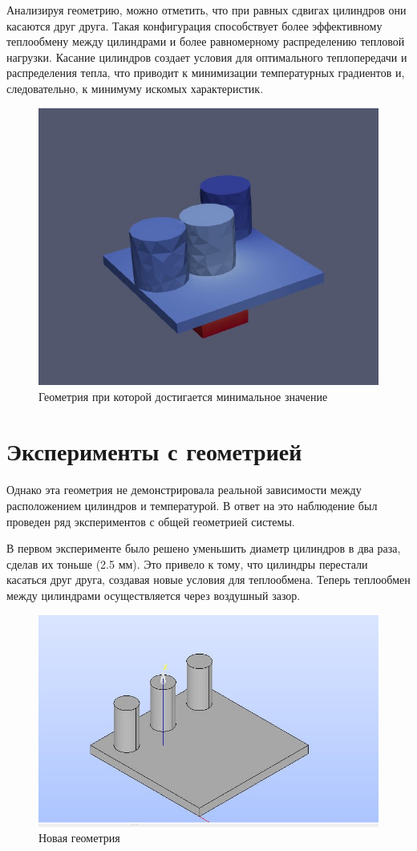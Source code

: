 \documentclass[a4paper,12pt]{article}
\theoremstyle{plain} %
\theoremstyle{definition} %
\theoremstyle{remark} %
\begin{document}
Анализируя геометрию, можно отметить, что при равных сдвигах цилиндров они касаются друг друга. Такая конфигурация способствует более эффективному теплообмену между цилиндрами и более равномерному распределению тепловой нагрузки. Касание цилиндров создает условия для оптимального теплопередачи и распределения тепла, что приводит к минимизации температурных градиентов и, следовательно, к минимуму искомых характеристик.

\begin{figure}[h]
	\begin{center}
		\includegraphics[width=0.4\linewidth]{19.jpg}
		\caption{Геометрия при которой достигается минимальное значение} %
	\end{center}
\end{figure}

\section{Эксперименты с геометрией}

Однако эта геометрия не демонстрировала реальной зависимости между расположением цилиндров и температурой. В ответ на это наблюдение был проведен ряд экспериментов с общей геометрией системы.

В первом эксперименте было решено уменьшить диаметр цилиндров в два раза, сделав их тоньше (2.5 мм). Это привело к тому, что цилиндры перестали касаться друг друга, создавая новые условия для теплообмена. Теперь теплообмен между цилиндрами осуществляется через воздушный зазор.

\begin{figure}[h]
	\begin{center}
		\includegraphics[width=0.4\linewidth]{20.jpg}
		\caption{Новая геометрия} %
	\end{center}
\end{figure}
\end{document}
